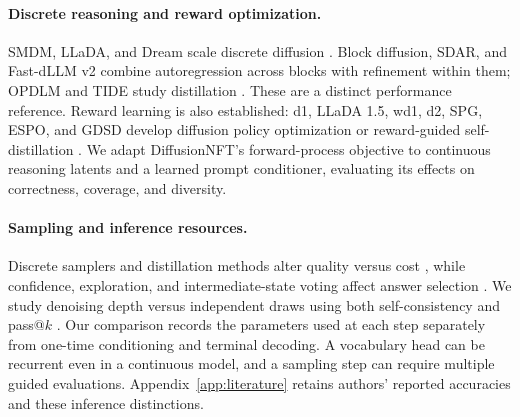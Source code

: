 \paragraph{Discrete reasoning and reward optimization.}
SMDM, LLaDA, and Dream scale discrete diffusion \citep{smdm,llada,dream}. Block diffusion, SDAR, and Fast-dLLM v2 combine autoregression across blocks with refinement within them; OPDLM and TIDE study distillation \citep{blockdiffusion,sdar,fastv2,opdlm,tide}. These are a distinct performance reference. Reward learning is also established: d1, LLaDA 1.5, wd1, d2, SPG, ESPO, and GDSD develop diffusion policy optimization or reward-guided self-distillation \citep{d1,llada15,wd1,d2,spg,espo,gdsd}. We adapt DiffusionNFT's forward-process objective \citep{diffusionnft} to continuous reasoning latents and a learned prompt conditioner, evaluating its effects on correctness, coverage, and diversity.

\paragraph{Sampling and inference resources.}
Discrete samplers and distillation methods alter quality versus cost \citep{fastdllm,cdlm,t3d}, while confidence, exploration, and intermediate-state voting affect answer selection \citep{qualityexploration,midtruth}. We study denoising depth versus independent draws using both self-consistency and pass@$k$ \citep{selfconsistency,codex}. Our comparison records the parameters used at each step separately from one-time conditioning and terminal decoding. A vocabulary head can be recurrent even in a continuous model, and a sampling step can require multiple guided evaluations. Appendix~\ref{app:literature} retains authors' reported accuracies and these inference distinctions.
